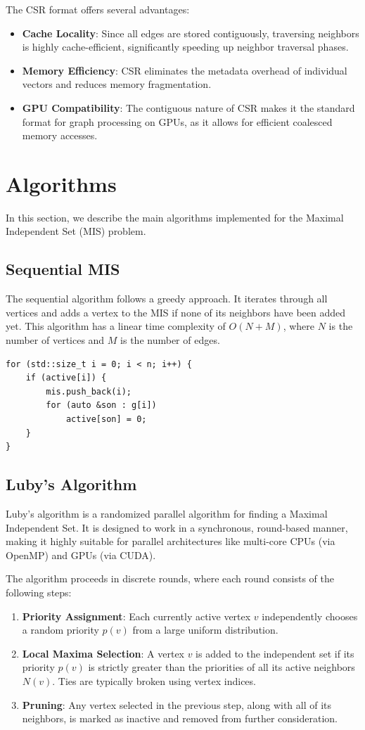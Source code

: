 \documentclass{article}
\begin{document}
The CSR format offers several advantages:
\begin{itemize}
    \item \textbf{Cache Locality}: Since all edges are stored contiguously, traversing neighbors is highly cache-efficient, significantly speeding up neighbor traversal phases.
    \item \textbf{Memory Efficiency}: CSR eliminates the metadata overhead of individual vectors and reduces memory fragmentation.
    \item \textbf{GPU Compatibility}: The contiguous nature of CSR makes it the standard format for graph processing on GPUs, as it allows for efficient coalesced memory accesses.
\end{itemize}

\section{Algorithms}
In this section, we describe the main algorithms implemented for the Maximal Independent Set (MIS) problem.

\subsection{Sequential MIS}
The sequential algorithm follows a greedy approach. It iterates through all vertices and adds a vertex to the MIS if none of its neighbors have been added yet. This algorithm has a linear time complexity of $O(N+M)$, where $N$ is the number of vertices and $M$ is the number of edges.

\begin{lstlisting}
for (std::size_t i = 0; i < n; i++) {
    if (active[i]) {
        mis.push_back(i);
        for (auto &son : g[i])
            active[son] = 0;
    }
}
\end{lstlisting}

\subsection{Luby's Algorithm \cite{luby1986}}
Luby's algorithm is a randomized parallel algorithm for finding a Maximal Independent Set. It is designed to work in a synchronous, round-based manner, making it highly suitable for parallel architectures like multi-core CPUs (via OpenMP) and GPUs (via CUDA).

The algorithm proceeds in discrete rounds, where each round consists of the following steps:
\begin{enumerate}
    \item \textbf{Priority Assignment}: Each currently active vertex $v$ independently chooses a random priority $p(v)$ from a large uniform distribution.
    \item \textbf{Local Maxima Selection}: A vertex $v$ is added to the independent set if its priority $p(v)$ is strictly greater than the priorities of all its active neighbors $N(v)$. Ties are typically broken using vertex indices.
    \item \textbf{Pruning}: Any vertex selected in the previous step, along with all of its neighbors, is marked as inactive and removed from further consideration.
\end{enumerate}
\end{document}
